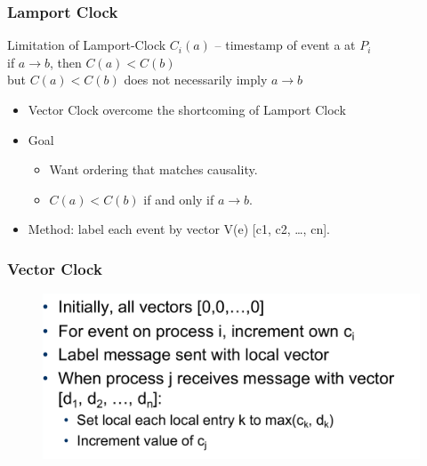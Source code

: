 \begin{frame}
    \frametitle{Lamport Clock}
    \begin{block}{Limitation of Lamport-Clock}
        $C_i(a)$ -- timestamp of event a at $P_i$ \\
        if $a \to b$, then $C(a) < C(b)$ \\
        but $C(a) < C(b)$ does not necessarily imply $a \to b$
    \end{block}
    \begin{itemize}
        \item Vector Clock overcome the shortcoming of Lamport Clock
        \item Goal
            \begin{itemize}
                \item Want ordering that matches causality.
                \item $C(a) < C(b)$ if and only if $a \to b$.
            \end{itemize}
        \item Method: label each event by vector V(e) [c1, c2, \ldots, cn].
    \end{itemize}
\end{frame}

\begin{frame}
    \frametitle{Vector Clock}
    \begin{figure}
        \centering
        \includegraphics[scale=0.3]{./figures/vector-clock1.png}
    \end{figure}
\end{frame}

